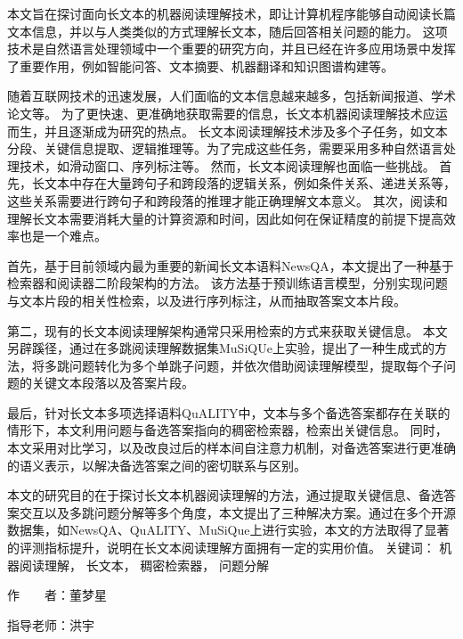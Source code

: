 
\begin{cabstract}
    本文旨在探讨面向长文本的机器阅读理解技术，即让计算机程序能够自动阅读长篇文本信息，并以与人类类似的方式理解长文本，随后回答相关问题的能力。
    这项技术是自然语言处理领域中一个重要的研究方向，并且已经在许多应用场景中发挥了重要作用，例如智能问答、文本摘要、机器翻译和知识图谱构建等。

    随着互联网技术的迅速发展，人们面临的文本信息越来越多，包括新闻报道、学术论文等。
    为了更快速、更准确地获取需要的信息，长文本机器阅读理解技术应运而生，并且逐渐成为研究的热点。
    长文本阅读理解技术涉及多个子任务，如文本分段、关键信息提取、逻辑推理等。为了完成这些任务，需要采用多种自然语言处理技术，如滑动窗口、序列标注等。
    然而，长文本阅读理解也面临一些挑战。
    首先，长文本中存在大量跨句子和跨段落的逻辑关系，例如条件关系、递进关系等，这些关系需要进行跨句子和跨段落的推理才能正确理解文本意义。
    其次，阅读和理解长文本需要消耗大量的计算资源和时间，因此如何在保证精度的前提下提高效率也是一个难点。

    首先，基于目前领域内最为重要的新闻长文本语料NewsQA，本文提出了一种基于检索器和阅读器二阶段架构的方法。
    该方法基于预训练语言模型，分别实现问题与文本片段的相关性检索，以及进行序列标注，从而抽取答案文本片段。

    第二，现有的长文本阅读理解架构通常只采用检索的方式来获取关键信息。
    本文另辟蹊径，通过在多跳阅读理解数据集MuSiQUe上实验，提出了一种生成式的方法，将多跳问题转化为多个单跳子问题，并依次借助阅读理解模型，提取每个子问题的关键文本段落以及答案片段。

    最后，针对长文本多项选择语料QuALITY中，文本与多个备选答案都存在关联的情形下，本文利用问题与备选答案指向的稠密检索器，检索出关键信息。
    同时，本文采用对比学习，以及改良过后的样本间自注意力机制，对备选答案进行更准确的语义表示，以解决备选答案之间的密切联系与区别。

    本文的研究目的在于探讨长文本机器阅读理解的方法，通过提取关键信息、备选答案交互以及多跳问题分解等多个角度，本文提出了三种解决方案。通过在多个开源数据集，如NewsQA、QuALITY、MuSiQue上进行实验，本文的方法取得了显著的评测指标提升，说明在长文本阅读理解方面拥有一定的实用价值。
	\vskip 21bp
	{\heiti{} 关键词：}
	机器阅读理解，
	长文本，
	稠密检索器，
	问题分解
	\begin{flushright}
		作~~~~者：董梦星
		
		指导老师：洪宇
		
	\end{flushright}
\end{cabstract}


